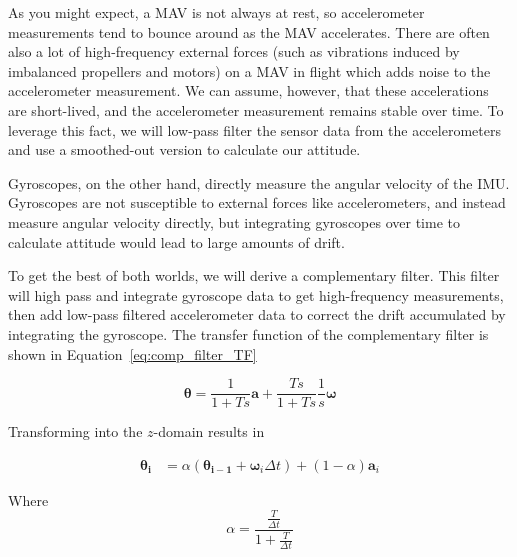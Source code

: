 \documentclass[paper=a4, fontsize=11pt]{scrartcl} %
\numberwithin{equation}{section} %
\numberwithin{figure}{section} %
\numberwithin{table}{section} %
\begin{document}
As you might expect, a MAV is not always at rest, so accelerometer measurements tend to bounce around as the MAV accelerates.  There are often also a lot of high-frequency external forces (such as vibrations induced by imbalanced propellers and motors) on a MAV in flight which adds noise to the accelerometer measurement.  We can assume, however, that these accelerations are short-lived, and the accelerometer measurement remains stable over time.  To leverage this fact, we will low-pass filter the sensor data from the accelerometers and use a smoothed-out version to calculate our attitude.

Gyroscopes, on the other hand, directly measure the angular velocity of the IMU.  Gyroscopes are not susceptible to external forces like accelerometers, and instead measure angular velocity directly, but integrating gyroscopes over time to calculate attitude would lead to large amounts of drift.

To get the best of both worlds, we will derive a complementary filter.  This filter will high pass and integrate gyroscope data to get high-frequency measurements, then add low-pass filtered accelerometer data to correct the drift accumulated by integrating the gyroscope.  The transfer function of the complementary filter is shown in Equation~\ref{eq:comp_filter_TF}

\begin{equation}
	\bm{\theta} = \frac{1}{1+Ts}\bm{a} + \frac{Ts}{1+Ts}\frac{1}{s}\bm{\omega}
	\label{eq:comp_filter_TF}
\end{equation}

Transforming into the $z$-domain results in

\begin{equation}
	\begin{aligned}
	  \bm{\theta_i} &= \alpha \left( \bm{\theta_{i-1}} + \bm{\omega}_i\Delta t  \right) + (1-\alpha) \bm{a}_i
  \end{aligned}
\end{equation}

Where
\begin{equation}
	\alpha = \frac{\frac{T}{\Delta t}}{1 + \frac{T}{\Delta t}}
\end{equation}
\end{document}
